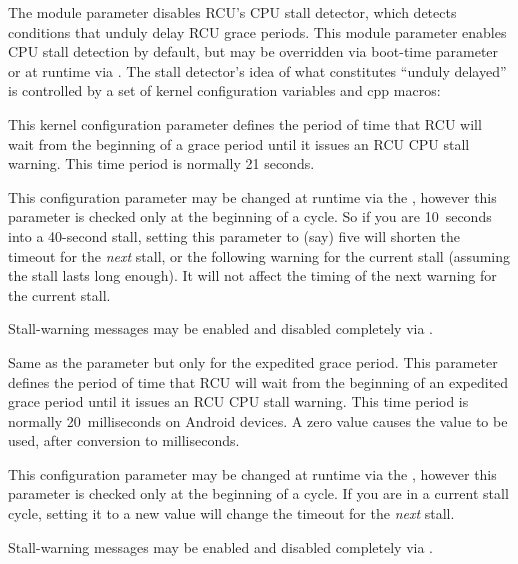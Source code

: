 The  module parameter disables RCU's
CPU stall detector, which detects conditions that unduly delay RCU grace
periods.
This module parameter enables CPU stall detection by default,
but may be overridden via boot-time parameter or at runtime via .
The stall detector's idea of what constitutes ``unduly delayed'' is
controlled by a set of kernel configuration variables and cpp macros:

\begin{description}[style=nextline]
\item[\tco{CONFIG_RCU_CPU_STALL_TIMEOUT}]
	This kernel configuration parameter defines the period of time
	that RCU will wait from the beginning of a grace period until it
	issues an RCU CPU stall warning.
	This time period is normally
	21 seconds.

	This configuration parameter may be changed at runtime via the
	, however
	this parameter is checked only at the beginning of a cycle.
	So if you are 10~seconds into a 40-second stall, setting this
	 parameter to (say) five will shorten the timeout for the
	\emph{next} stall, or the following warning for the current stall
	(assuming the stall lasts long enough).
	It will not affect the
	timing of the next warning for the current stall.

	Stall-warning messages may be enabled and disabled completely via
	.

\item[\tco{CONFIG_RCU_EXP_CPU_STALL_TIMEOUT}]
	Same as the  parameter but only for
	the expedited grace period.
        This parameter defines the period
	of time that RCU will wait from the beginning of an expedited
	grace period until it issues an RCU CPU stall warning.
	This time
	period is normally 20~milliseconds on Android devices.
	A zero
	value causes the  value to be used,
	after conversion to milliseconds.

	This configuration parameter may be changed at runtime via the
	, however
	this parameter is checked only at the beginning of a cycle.
	If you
	are in a current stall cycle, setting it to a new value will change
	the timeout for the \emph{next} stall.

	Stall-warning messages may be enabled and disabled completely via
	.


\end{description}
